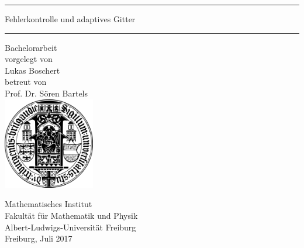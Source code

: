 \thispagestyle{empty}
\mbox{}
\begin{center}
\vspace*{2cm}
\hrule \vspace*{4mm}
{\huge \textsf{Fehlerkontrolle und adaptives Gitter}} \\[3mm]
\hrule \vspace*{3cm}
{\sc \huge Bachelorarbeit} \\[1cm]
vorgelegt von \\[.5cm]
{\Large Lukas Boschert} \\[1cm]
betreut von \\[.5cm]
{\Large Prof. Dr. S\"oren Bartels} \\[1.5cm]
\includegraphics[width=4cm]{pics/alu-wappen}

\bigskip

{\sc Mathematisches Institut} \\
{\sc Fakult\"at f\"ur Mathematik und Physik} \\
{\sc Albert-Ludwigs-Universit\"at Freiburg} \\[1cm]
{\Large Freiburg, Juli 2017}

\end{center}
\mbox{}

\newpage
\thispagestyle{empty}
\mbox{}


